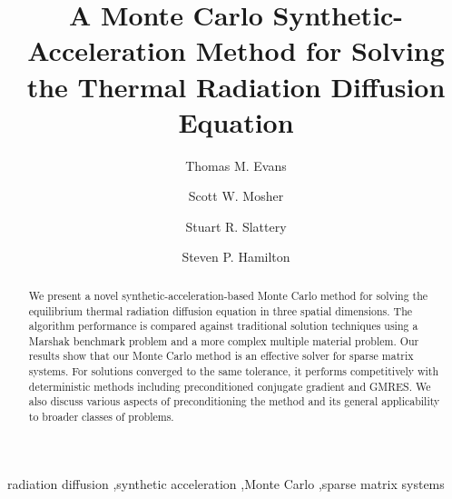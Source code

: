 \documentclass[preprint,12pt]{elsarticle}
\begin{document}
\begin{frontmatter}

  \title{A Monte Carlo Synthetic-Acceleration Method for Solving the Thermal
    Radiation Diffusion Equation}

  \author[ornl]{Thomas M. Evans} 

  \author[ornl]{Scott W. Mosher} 

  \author[wisc]{Stuart R. Slattery} 

  \author[ornl]{Steven P. Hamilton} 

   

  \address[ornl]{Oak Ridge National Laboratory, 1 Bethel Valley Rd., Oak
    Ridge, TN 37831 U.S.A.}  \address[wisc]{University of Wisconsin-Madison,
    1500 Engineering Dr., Madison, WI 53716 U.S.A.}

  \begin{abstract}

    We present a novel synthetic-acceleration-based Monte Carlo method for
    solving the equilibrium thermal radiation diffusion equation in three
    spatial dimensions. The algorithm performance is compared against
    traditional solution techniques using a Marshak benchmark problem and a
    more complex multiple material problem. Our results show that our Monte
    Carlo method is an effective solver for sparse matrix systems. For
    solutions converged to the same tolerance, it performs competitively with
    deterministic methods including preconditioned conjugate gradient and
    GMRES. We also discuss various aspects of preconditioning the method and
    its general applicability to broader classes of problems.

  \end{abstract}

  \begin{keyword}
    radiation diffusion \sep synthetic acceleration \sep Monte Carlo
    \sep sparse matrix systems
  \end{keyword}

\end{frontmatter}
\end{document}
